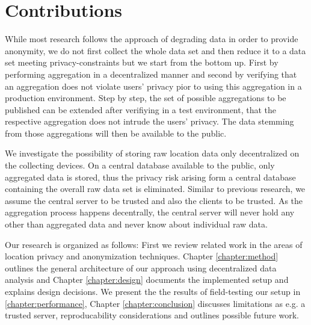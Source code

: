 \section{Contributions}
While most research follows the approach of degrading data in order to provide anonymity, we do not first collect the whole data set and then reduce it to a data set meeting privacy-constraints but we start from the bottom up. First by performing aggregation in a decentralized manner and second by verifying that an aggregation does not violate users' privacy pior to using this aggregation in a production environment. Step by step, the set of possible aggregations to be published can be extended after verifiying in a test environment, that the respective aggregation does not intrude the users' privacy. The data stemming from those aggregations will then be available to the public. 

We investigate the possibility of storing raw location data only decentralized on the collecting devices. On a central database available to the public, only aggregated data is stored, thus the privacy risk arising form a central database containing the overall raw data set is eliminated. Similar to previous research, we assume the central server to be trusted and also the clients to be trusted. As the aggregation process happens decentrally, the central server will never hold any other than aggregated data and never know about individual raw data. 

Our research is organized as follows: First we review related work in the areas of location privacy and anonymization techniques.
Chapter \ref{chapter:method} outlines the general architecture of our approach using decentralized data analysis and Chapter \ref{chapter:design} documents the implemented setup and explains design decisions. We present the the results of field-testing our setup in \ref{chapter:performance}, Chapter \ref{chapter:conclusion} discusses limitations as e.g. a trusted server, reproducability considerations and outlines possible future work.



